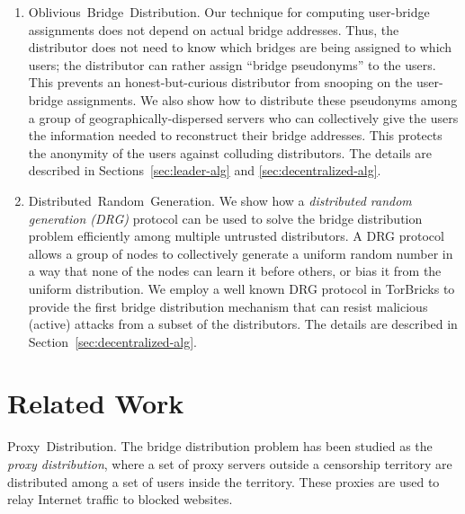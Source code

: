 \documentclass[USenglish,oneside,twocolumn]{article}
\newcommand{\fullpaper}[1]{#1}
\newcommand{\fullpaper}[1]{}
\newcommand{\bricks}{}
\def\bricks/{\textsf{\sfsize \mbox{TorBricks}}}
\newcommand{\sfsize}{\fontsize{0.68\baselineskip}{0.68\baselineskip}\selectfont}
\newcommand{\sans}[1]{\textsf{\sfsize \mbox{#1}}}
\newcommand{\para}[1]{\vspace{0.85em} \noindent \sans{{\mbox{#1}}}}
\begin{document}
\begin{enumerate}[leftmargin=1.7em, itemsep=0.7em, topsep=0.6em]
	\item \sans{Oblivious Bridge Distribution.} Our technique for computing user-bridge assignments does not depend on actual bridge addresses. Thus, \fullpaper{the distributor does not need to know which bridges are being assigned to which users;} the distributor can \fullpaper{rather} assign ``bridge pseudonyms'' to the users. This prevents an honest-but-curious distributor from snooping on the user-bridge assignments.
	We also show how to distribute these pseudonyms among a group of geographically-dispersed servers who can collectively give the users the information needed to reconstruct their bridge addresses. This protects the anonymity of the users against colluding distributors. The details are described in Sections~\ref{sec:leader-alg} and \ref{sec:decentralized-alg}.
	
	
	\item \sans{Distributed Random Generation.} We show how a \emph{distributed random generation (DRG)} protocol can be used to solve the bridge distribution problem efficiently among multiple untrusted distributors. A DRG protocol allows a group of nodes to collectively generate a uniform random number in a way that none of the nodes can learn it before others, or bias it from the uniform distribution. We employ a well known DRG protocol in \bricks/ to provide the first bridge distribution mechanism that can resist malicious (active) attacks from a subset of the distributors. The details are described in Section~\ref{sec:decentralized-alg}.
\end{enumerate}

\section{Related Work} \label{sec:relatedwork}
\para{Proxy Distribution.} The bridge distribution problem has been studied as the \emph{proxy distribution}, where a set of proxy servers outside a censorship territory are distributed among a set of users inside the territory. These proxies are used to relay Internet traffic to blocked websites. 
\end{document}
